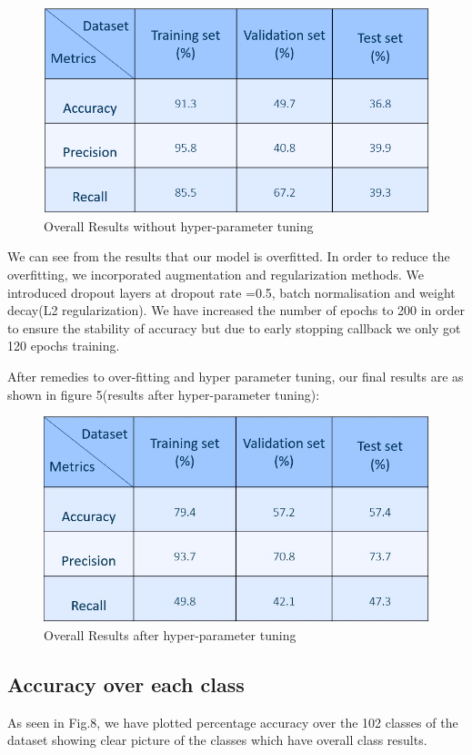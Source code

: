 \documentclass[a4paper,19pt]{article}
\begin{document}
\begin{figure}[h!]
\centering
\includegraphics[scale=0.7]{images/Capture.PNG}
\caption{Overall Results without hyper-parameter tuning}
\label{fig:Results}
\end{figure}

We can see from the results that our model is overfitted.
In order to reduce the overfitting, we incorporated augmentation and regularization methods.
We introduced dropout layers at dropout rate =0.5, batch normalisation and weight decay(L2 regularization).
We have increased the number of epochs to 200 in order to ensure the stability of accuracy but due to early stopping callback we only got 120 epochs training. 

After remedies to over-fitting and hyper parameter tuning, our final results are as shown in figure 5(results after hyper-parameter tuning):

\begin{figure}[h!]
\centering
\includegraphics[scale=0.45]{images/Results_after.jpeg}
\caption{Overall Results after hyper-parameter tuning}
\label{fig:Results}
\end{figure}

\subsection{Accuracy over each class}
As seen in Fig.8, we have plotted percentage accuracy over the 102 classes of the dataset showing clear picture of the classes which have overall class results.
\end{document}
